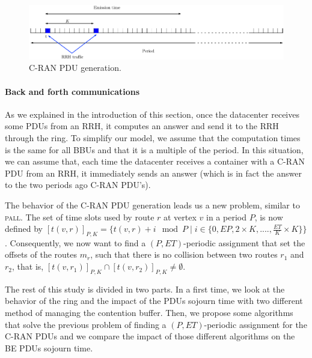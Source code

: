 \documentclass[a4paper,10pt,english]{article}
\newcommand\pall{\textsc{pall}\xspace}
\begin{document}
        \begin{figure}[h!]
\begin{center}   

      \includegraphics[width=\textwidth]{emission_antenna.pdf}
     \caption{C-RAN PDU generation.}
\end{center}
  \end{figure}
  \paragraph{Back and forth communications} As we explained in the introduction of this section, once the datacenter receives some PDUs from an RRH, it computes an answer and send it to the RRH through the ring. To simplify our model, we assume that the computation times is the same for all BBUs and that it is a multiple of the period. In this situation, we can assume that, each time the datacenter receives a container with a C-RAN PDU from an RRH, it immediately sends an answer (which is in fact the answer to the two periods ago C-RAN PDU's).
  
  
 The behavior of the C-RAN PDU generation leads us a new problem, similar to \pall. The set of time slots used by route $r$ at vertex $v$ in a period $P$, is now defined by $[t(v,r)]_{P,K} = \{t(v,r) +i \mod P \mid i \in \{0,EP,2\times K,...., \frac{ET}{K}\times K\} \}$. Consequently, we now want to find a $(P,ET)$-periodic assignment that set the offsets of the routes $m_r$, such that there is no collision between two routes $r_1$ and $r_2$, that is, $[t(v,r_{1})]_{P,K} \cap [t(v,r_{2})]_{P,K} \neq \emptyset$. 
  
  
  
 The rest of this study is divided in two parts. In a first time, we look at the behavior of the ring and the impact of the PDUs sojourn time with two different method of managing the contention buffer. Then, we propose some algorithms that solve the previous problem of finding a $(P,ET)$-periodic assignment for the C-RAN PDUs and we compare the impact of those different algorithms on the BE PDUs sojourn time.
\end{document}
